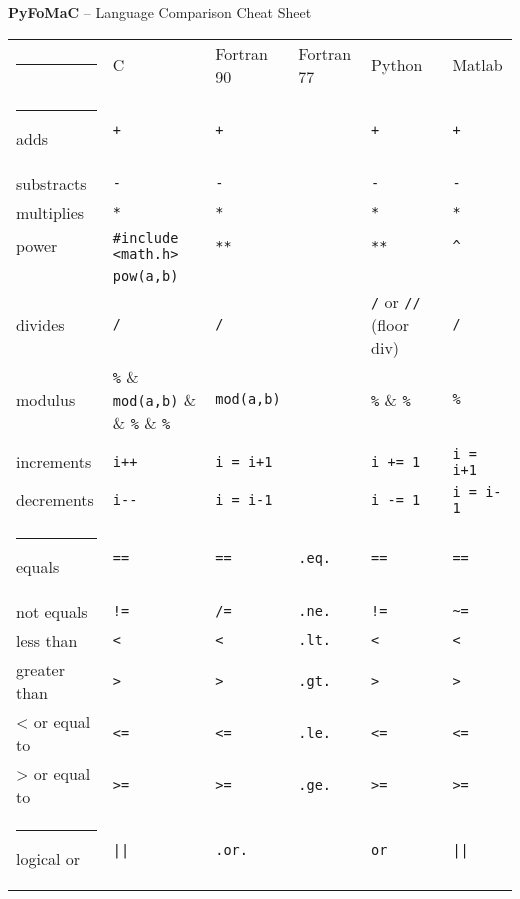 \documentclass[a3paper,10pt,portrait]{article}
\makeatletter
\def\hlinewd#1{%
\noalign{\ifnum0=`}\fi\hrule \@height #1 %
\futurelet\reserved@a\@xhline}
\newcommand{\hhline}{\hlinewd{1pt}}	%
\renewcommand{\hline}{\hlinewd{0.1pt}}	%
\makeatother
\begin{document}
\pagestyle{empty}

\begin{center}

\Huge{\textbf{PyFoMaC} -- Language Comparison Cheat Sheet}
\normalsize

\bigskip

\bigskip

\begin{tabular}{p{4cm} p{4cm} p{4cm} p{4cm} p{4cm} p{4cm}}
\hhline
 			& C		& Fortran 90	& Fortran 77			& Python 		& Matlab 	\\ 
\hhline
adds			& \verb|+|		& \verb|+| & \verb|| 		& \verb|+| 		& \verb|+| 		\\
substracts		& \verb|-|		& \verb|-| & \verb|| 		& \verb|-| 		& \verb|-| 		\\
multiplies		& \verb|*|		& \verb|*| & \verb|| 		& \verb|*| 		& \verb|*| 		\\
power		& \verb|#include <math.h>| 		& \verb|**| & \verb|| 		& \verb|**| 		& \verb|^| 		\\
& \verb|pow(a,b)| & & & & \\
divides		& \verb|/|		& \verb|/| & \verb|| 		& \verb|/| or \verb|//| (floor div) & \verb|/| 	\\
modulus		& \verb|%|		& \verb|mod(a,b)| & \verb|| 		& \verb|%| 		& \verb|%| 		\\
& & & & \\
increments		& \verb|i++|		& \verb|i = i+1| & \verb|| 		& \verb|i += 1| 		& \verb|i = i+1| 	\\	
decrements		& \verb|i--|		& \verb|i = i-1| & \verb|| 		& \verb|i -= 1| 		& \verb|i = i-1| 	\\	
\hline
equals		& \verb|==| 		& \verb|==| & \verb|.eq.| 	& \verb|==|		& \verb|==|		\\
not equals		& \verb|!=|		& \verb|/=| & \verb|.ne.| 	& \verb|!=| 		& \verb|~=|	\\
less than		& \verb|<|		& \verb|<| & \verb|.lt.| 	& \verb|<| 		& \verb|<| 	\\	
greater than		& \verb|>|		& \verb|>| & \verb|.gt.| 	& \verb|>| 		& \verb|>| 	\\	
< or equal to	& \verb|<=|		& \verb|<=| & \verb|.le.| 	& \verb|<=| 		& \verb|<=| 		\\
> or equal to	& \verb|>=|		& \verb|>=| & \verb|.ge.| 	& \verb|>=| 		& \verb|>=| 		\\
\hline
logical or		& \verb=||=		& \multicolumn{2}{p{3.0cm}}{\texttt{.or.}}	& \verb|or| 		& \verb=||= 	\\

\end{tabular}
\end{center}
\end{document}
